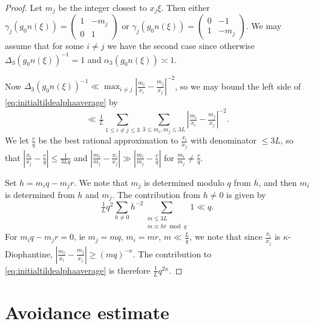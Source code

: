 \documentclass[12pt]{amsart}
\theoremstyle{definition}
\theoremstyle{remark}
\numberwithin{equation}{section}
\begin{document}
  \begin{proof}
    Let $m_j$ be the integer closest to $x_j \xi$.
    Then either $\gamma_j(g_0n(\xi)) =
    \begin{pmatrix}
      1 & -m_j \\
      0 & 1
    \end{pmatrix}
    $ or $\gamma_j(g_0n(\xi)) =
    \begin{pmatrix}
      0 & -1 \\
      1 & -m_j
    \end{pmatrix}
    $.
    We may assume that for some $i\neq j$ we have the second case
    since otherwise $\Delta_3(g_0n(\xi))^{-1} =1$ and $\alpha_3(g_0n(\xi)) \asymp 1$.

    Now $\Delta_3(g_0 n(\xi))^{-1} \ll \max_{i\neq j} |\tfrac{m_i}{x_i} - \tfrac{m_j}{x_j}|^{-2}$, so we may bound the left side of \eqref{eq:initialtildealphaaverage} by
    \begin{equation}
      \label{eq:mimjsum}
      \ll \tfrac{1}{L} \sum_{1\leq i\neq j\leq 3} \sum_{3\leq m_i,m_j \leq 3L} |\tfrac{m_i}{x_i} - \tfrac{m_j}{x_j}|^{-2} . 
    \end{equation}
    We let $\tfrac{r}{q}$ be the best rational approximation to $\frac{x_i}{x_j}$ with denominator $\leq 3L$, so that $|\tfrac{x_i}{x_j} - \tfrac{r}{q}| \leq \tfrac{1}{3Lq}$ and $|\tfrac{m_i}{m_j} - \tfrac{x_i}{x_j}| \gg |\tfrac{m_i}{m_j} - \tfrac{r}{q}|$ for $\tfrac{m_i}{m_j} \neq \tfrac{r}{q}$.

    Set $h = m_iq - m_j r$.
    We note that $m_j$ is determined modulo $q$ from $h$, and then $m_i$ is determined from $h$ and $m_j$.
    The contribution from $h \neq 0$ is given by
    \begin{equation}
      \label{eq:mimjhnot0}
      \tfrac{1}{L} q^2 \sum_{h\neq 0} h^{-2} \sum_{\substack{ m \leq 3L \\ m \equiv h \bar r \bmod q}} 1 \ll q. 
    \end{equation}
    For $m_i q - m_j r = 0$, ie $m_j = mq$, $m_i = mr$, $m \ll \tfrac{L}{q}$, we note that since $\tfrac{x_i}{x_j}$ is $\kappa$-Diophantine, $|\tfrac{m_i}{x_i} - \tfrac{m_j}{x_j}| \geq (mq)^{-\kappa}$.
    The contribution to \eqref{eq:initialtildealphaaverage} is therefore $\tfrac{1}{L} q^{2\kappa}$. 
  \end{proof}

\section{Avoidance estimate}
\label{sec:avoidance}
\end{document}
